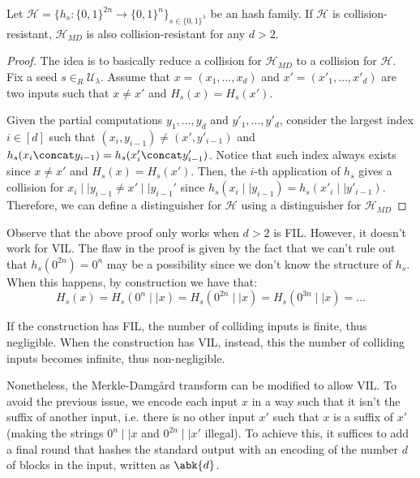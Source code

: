 \documentclass[a4paper, 12pt]{report}
\begin{document}
    \begin{framedprop}{}
        Let $\mathcal{H} = \{h_s : \{0,1\}^{2n} \to \{0,1\}^n\}_{s \in \{0,1\}^\lambda}$ be an hash family. If $\mathcal{H}$ is collision-resistant, $\mathcal{H}_{MD}$ is also collision-resistant for any $d > 2$.
    \end{framedprop}

    \begin{proof}
        The idea is to basically reduce a collision for $\mathcal{H}_{MD}$ to a collision for $\mathcal{H}$. Fix a seed $s \in_R \mathcal{U}_\lambda$. Assume that $x = (x_1, \ldots, x_d)$ and $x' = (x'_1, \ldots, x'_d)$ are two inputs such that $x \neq x'$ and $H_s(x) = H_s(x')$.

        Given the partial computations $y_1, \ldots, y_d$ and $y'_1, \ldots, y'_d$, consider the largest index $i \in [d]$ such that $(x_i, y_{i-1}) \neq (x', y'_{i-1})$  and $h_s(x_i \concat y_{i-1}) = h_s(x'_i \concat y'_{i-1})$. Notice that such index always exists since $x \neq x'$ and $H_s(x) = H_s(x')$. Then, the $i$-th application of $h_s$ gives a collision for $x_i \mid\mid y_{i-1} \neq x'\mid\mid y_{i-1}'$ since $h_s(x_i \mid\mid y_{i-1}) = h_s(x'_i \mid\mid y'_{i-1})$. Therefore, we can define a distinguisher for $\mathcal{H}$ using a distinguisher for $\mathcal{H}_{MD}$
    \end{proof}

    Observe that the above proof only works when $d > 2$ is FIL. However, it doesn't work for VIL. The flaw in the proof is given by the fact that we can't rule out that $h_s(0^{2n}) = 0^n$ may be a possibility since we don't know the structure of $h_s$. When this happens, by construction we have that:
    \[H_s(x) = H_s(0^n \mid\mid x) = H_s(0^{2n} \mid\mid x) = H_s(0^{3n} \mid\mid x) = \ldots\]

    If the construction has FIL, the number of colliding inputs is finite, thus negligible. When the construction has VIL, instead, this the number of colliding inputs becomes infinite, thus non-negligible.

    Nonetheless, the Merkle-Damg\aa rd transform can be modified to allow VIL. To avoid the previous issue, we encode each input $x$ in a way such that it isn't the suffix of another input, i.e. there is no other input $x'$ such that $x$ is a suffix of $x'$ (making the strings $0^n \mid\mid x$ and $0^{2n} \mid\mid x'$ illegal). To achieve this, it suffices to add a final round that hashes the standard output with an encoding of the number $d$ of blocks in the input, written as $\abk{d}$.
\end{document}
